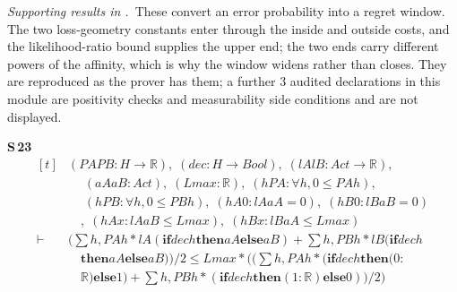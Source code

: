 
\noindent\emph{Supporting results in .}~These convert an error probability into a regret window. The two loss-geometry constants enter through the inside and outside costs, and the likelihood-ratio bound supplies the upper end; the two ends carry different powers of the affinity, which is why the window widens rather than closes. They are reproduced as the prover has them; a further $3$ audited declarations in this module are positivity checks and measurability side conditions and are not displayed.

\noindent\textbf{S\,23}\quad{}
{\footnotesize\[ \begin{aligned}[t]
&(\mathit{PA} \mathit{PB} : \mathit{H} \to \mathbb{R} ),\; (\mathit{dec} : \mathit{H} \to \mathit{Bool}),\; (\mathit{lA} \mathit{lB} : \mathit{Act} \to \mathbb{R} ),\\
&\quad \; (\mathit{aA} \mathit{aB} : \mathit{Act}),\; (\mathit{Lmax} : \mathbb{R} ),\; (\mathit{hPA} : \forall \mathit{h}, 0 \leq \mathit{PA} \mathit{h}),\\
&\quad \; (\mathit{hPB} : \forall \mathit{h}, 0 \leq \mathit{PB} \mathit{h}),\; (\mathit{hA0} : \mathit{lA} \mathit{aA} = 0),\; (\mathit{hB0} : \mathit{lB} \mathit{aB} = 0)\\
&\quad ,\; (\mathit{hAx} : \mathit{lA} \mathit{aB} \leq \mathit{Lmax}),\; (\mathit{hBx} : \mathit{lB} \mathit{aA} \leq \mathit{Lmax})\\
\vdash\;&(\textstyle\sum \mathit{h}, \mathit{PA} \mathit{h} * \mathit{lA} (\mathbf{if} \mathit{dec} \mathit{h} \mathbf{then} \mathit{aA} \mathbf{else} \mathit{aB}) + \textstyle\sum \mathit{h}, \mathit{PB} \mathit{h} * \mathit{lB} (\mathbf{if} \mathit{dec} \mathit{h}\\
&\quad \mathbf{then} \mathit{aA} \mathbf{else} \mathit{aB})) / 2 \leq \mathit{Lmax} * ((\textstyle\sum \mathit{h}, \mathit{PA} \mathit{h} * (\mathbf{if} \mathit{dec} \mathit{h} \mathbf{then} (0:\\
&\quad \mathbb{R} ) \mathbf{else} 1) + \textstyle\sum \mathit{h}, \mathit{PB} \mathit{h} * (\mathbf{if} \mathit{dec} \mathit{h} \mathbf{then} (1:\mathbb{R} ) \mathbf{else} 0)) / 2)
\end{aligned} \]}

